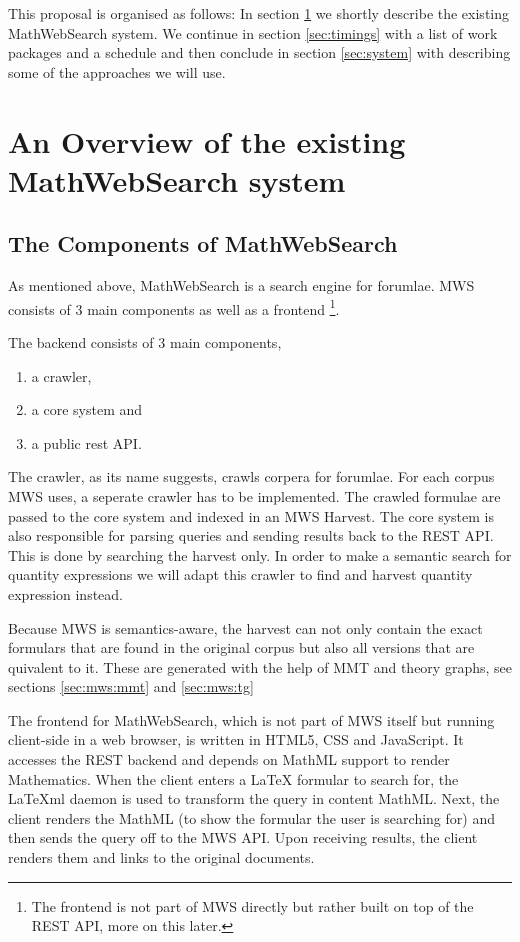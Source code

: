 \documentclass[11pt]{article}
\begin{document}
This proposal is organised as follows: In section \ref{sec:mws} we shortly describe the existing MathWebSearch system. We continue in section \ref{sec:timings} with a list of work packages and a schedule and then conclude in section \ref{sec:system} with describing some of the approaches we will use.

\section{An Overview of the existing MathWebSearch system}
\label{sec:mws}

\subsection{The Components of MathWebSearch}

As mentioned above, MathWebSearch is a search engine for forumlae. MWS consists of 3 main components as well as a frontend \footnote{The frontend is not part of MWS directly but rather built on top of the REST API, more on this later. }\cite{KohPro:MWSmanual}.

The backend consists of 3 main components,
\begin{enumerate}
  \item a crawler,
  \item a core system and
  \item a public rest API.
\end{enumerate}

The crawler, as its name suggests, crawls corpera for forumlae. For each corpus MWS uses, a seperate crawler has to be implemented. The crawled formulae are passed to the core system and indexed in an MWS Harvest. The core system is also responsible for parsing queries and sending results back to the REST API. This is done by searching the harvest only. In order to make a semantic search for quantity expressions we will adapt this crawler to find and harvest quantity expression instead.

Because MWS is semantics-aware, the harvest can not only contain the exact formulars that are found in the original corpus but also all versions that are quivalent to it. These are generated with the help of MMT and theory graphs, see sections \ref{sec:mws:mmt} and \ref{sec:mws:tg}

The frontend for MathWebSearch, which is not part of MWS itself but running client-side in a web browser, is written in HTML5, CSS and JavaScript. It accesses the REST backend and depends on MathML support to render Mathematics. When the client enters a \LaTeX{} formular to search for, the \LaTeX{}ml daemon \cite{latexml-daemon} is used to transform the query in content MathML. Next, the client renders the MathML (to show the formular the user is searching for) and then sends the query off to the MWS API. Upon receiving results, the client renders them and links to the original documents.
\end{document}
